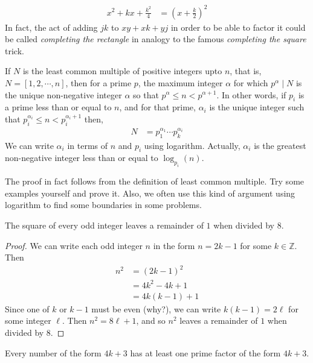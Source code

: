 \documentclass{subfile}
\begin{document}
	\begin{align*}
		x^2+kx+\frac{k^2}{4}
			& =\left(x+\frac{k}{2}\right)^2
	\end{align*}
	In fact, the act of adding ${jk}$ to ${xy}+{xk}+{yj}$ in order to be able to factor it could be called \textit{completing the rectangle} in analogy to the famous \textit{completing the square} trick.
	\begin{theorem}\label{thm:lcmfactor}
		If $N$ is the least common multiple of positive integers upto $n$, that is, $N=[1,2,\cdots,n]$, then for a prime $p$, the maximum  integer $\alpha$ for which $p^\alpha\mid N$ is the unique non-negative integer $\alpha$ so that $p^\alpha\leq n<p^{\alpha+1}$. In other words, if $p_i$ is a prime less than or equal to $n$, and for that prime, $\alpha_i$ is the unique integer such that $p_i^{\alpha _i}\leq n<p_i^{\alpha_i+1}$ then,
		\begin{align*}
			N & = p_1^{\alpha _1}\cdots p_k^{\alpha_i}
		\end{align*}\label{thm:lcm}
		We can write $\alpha _i$ in terms of $n$ and $p_i$ using logarithm. Actually, $\alpha_i$ is the greatest non-negative integer less than or equal to $\log_{p_i}(n)$.
	\end{theorem}
	The proof in fact follows from the definition of least common multiple. Try some examples yourself and prove it. Also, we often use this kind of argument using logarithm to find some boundaries in some problems.

	\begin{theorem}
		The square of every odd integer leaves a remainder of $1$ when divided by $8$.
	\end{theorem}

	\begin{proof}
		We can write each odd integer $n$ in the form $n=2k-1$ for some $k\in\mathbb{Z}$. Then
		\begin{align*}
			n^2
				& = (2k-1)^2\\
				& = 4k^2-4k+1\\
				& = 4k(k-1)+1
		\end{align*}
		Since one of $k$ or $k-1$ must be even (why?), we can write $k(k-1)=2\ell$ for some integer $\ell$. Then $n^2=8\ell+1$, and so $n^2$ leaves a remainder of $1$ when divided by $8$.
	\end{proof}

	\begin{theorem}\label{thm:4k+3prime}
		Every number of the form $4k+3$ has at least one prime factor of the form $4k+3$.
	\end{theorem}
\end{document}
